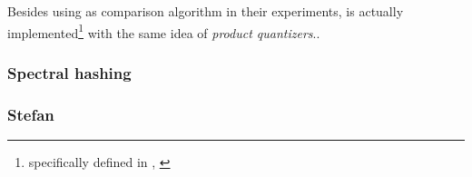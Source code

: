 Besides using \pq{} as comparison algorithm in their experiments, \qs{} is actually implemented\footnote{specifically defined in , \cite[p. 5]{wagner17}} with the same idea of \textit{product quantizers}..

\subsubsection{Spectral hashing}

\subsubsection{Stefan}

